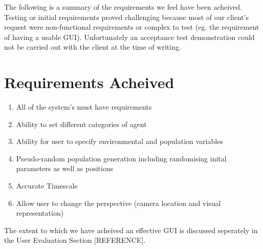 The following is a summary of the requirements we feel have been acheived. Testing or initial requirements proved challenging because most of our client's request were non-functional requirements or complex to test (eg. the requirement of having a usable GUI). Unfortunately an acceptance test demonstration could not be carried out with the client at the time of writing.

\section{Requirements Acheived}
\begin{enumerate}
\item{All of the system's must have requirements}
\item{Ability to set different categories of agent}
\item{Ability for user to specify environmental and population variables}
\item{Pseudo-random population generation including randomising inital parameters as well as positions}
\item{Accurate Timescale}
\item{Allow user to change the perspective (camera location and visual representation)}
\end{enumerate}

The extent to which we have acheived an effective GUI is discussed seperately in the User Evaluation Section [REFERENCE]. 
